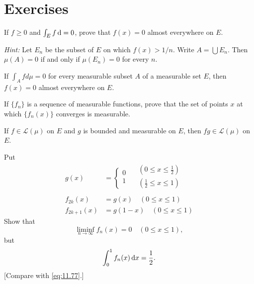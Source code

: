 
\section{Exercises}

\begin{myexercise}
    \label{ex:11.1}
    If $f \geq 0$ and $\int_E f \d = 0$, prove that $f(x) = 0$ almost everywhere on $E$.

    \emph{Hint:} Let $E_n$ be the subset of $E$ on which $f(x) > 1/n$.
    Write $A = \bigcup E_n$.
    Then $\mu(A)= 0$ if and only if $\mu(E_n)= 0$ for every $n$.
\end{myexercise}


\begin{myexercise}
    \label{ex:11.2}
    If $\int_A f d \mu = 0$ for every measurable subset $A$ of a measurable set $E$, then $f(x) = 0$ almost everywhere on $E$.
\end{myexercise}


\begin{myexercise}
    \label{ex:11.3}
    If $\{f_n\}$ is a sequence of measurable functions, prove that the set of points $x$ at which $\{f_n(x)\}$ converges is measurable.
\end{myexercise}


\begin{myexercise}
    \label{ex:11.4}
    If $f \in \mathscr{L}(\mu)$ on $E$ and $g$ is bounded and measurable on $E$, then $fg \in \mathscr{L}(\mu)$ on $E$.
\end{myexercise}


\begin{myexercise}
    \label{ex:11.5}
    Put
    \begin{align*}
        g(x)        & =
        \left\{
        \begin{array}{l}
            0 \\
            1 \\
        \end{array}
        \right.     \quad
        \begin{array}{l}
            (0 \leq x \leq \frac{1}{2}) \\
            (\frac{1}{2} \leq x \leq 1) \\
        \end{array}                    \\
        f_{2k}(x)   & = g(x)   \quad (0 \leq x \leq 1) \\
        f_{2k+1}(x) & = g(1-x) \quad (0 \leq x \leq 1)
    \end{align*}
    Show that
    \begin{equation*}
        \liminf_{n \to \infty} f_n(x) = 0
        \quad
        (0 \leq x \leq 1),
    \end{equation*}
    but
    \begin{equation*}
        \int_{0}^{1} f_n(x) \d x = \frac{1}{2}.
    \end{equation*}
    [Compare with \eqref{eq:11.77}.]
\end{myexercise}


